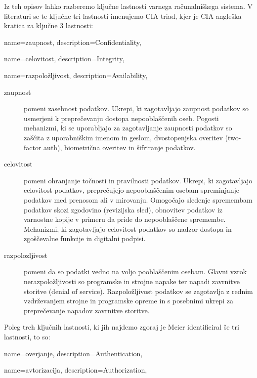 \documentclass[12pt,a4paper,openany]{book}
\begin{document}
Iz teh opisov lahko razberemo ključne lastnosti varnega računalniškega sistema. V literaturi se te ključne tri lastnosti imenujemo CIA triad, kjer je CIA angleška kratica za ključne 3 lastnosti:

{
  name=zaupnost,
  description={Confidentiality},
}

{
  name=celovitost,
  description={Integrity},
}

{
  name=razpoložljivost,
  description={Availability},
}

\begin{description}
\item[\Gls{zaupnost}] pomeni zasebnost podatkov. Ukrepi, ki zagotavljajo zaupnost podatkov so usmerjeni k preprečevanju dostopa nepooblaščenih oseb. Pogosti mehanizmi, ki se uporabljajo za zagotavljanje zaupnosti podatkov so zaščita z uporabniškim imenom in geslom, dvostopenjska overitev (two-factor auth), biometrična overitev in šifriranje podatkov.

\item[\Gls{celovitost}] pomeni ohranjanje točnosti in pravilnosti podatkov. Ukrepi, ki zagotavljajo celovitost podatkov, preprečujejo nepooblaščenim osebam spreminjanje podatkov med prenosom ali v mirovanju. Omogočajo sledenje spremembam podatkov skozi zgodovino (revizijska sled), obnovitev podatkov iz varnostne kopije v primeru da pride do nepooblaščene spremembe. Mehanizmi, ki zagotavljajo celovitost podatkov so nadzor dostopa in zgoščevalne funkcije in digitalni podpisi.

\item[\Gls{razpolozljivost}] pomeni da so podatki vedno na voljo pooblaščenim osebam. Glavni vzrok nerazpoložljivosti so programske in strojne napake ter napadi zavrnitve storitve (denial of service). Razpoložljivost podatkov se zagotavlja z rednim vzdrževanjem strojne in programske opreme in s posebnimi ukrepi za preprečevanje napadov zavrnitve storitve.

\end{description}

Poleg treh ključnih lastnosti, ki jih najdemo zgoraj je Meier identificiral še tri lastnosti, to so:

{
  name=overjanje,
  description={Authentication},
}

{
  name=avtorizacija,
  description={Authorization},
}
\end{document}
